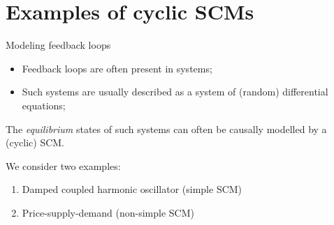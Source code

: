 \part{Examples of cyclic SCMs}
\frame{\partpage}

\begin{frame}{Modeling feedback loops}
  \begin{itemize}
    \item Feedback loops are often present in systems;
    \item Such systems are usually described as a system of (random) differential equations;
  \end{itemize}

The \emph{equilibrium} states of such systems can often be causally modelled by a (cyclic) SCM.

\bigskip
We consider two examples:
  \begin{enumerate}
    \item Damped coupled harmonic oscillator (simple SCM)
    \item Price-supply-demand (non-simple SCM)
  \end{enumerate}
\end{frame}

